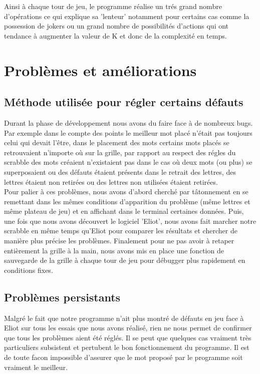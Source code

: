 \documentclass[a4paper,8pt,french,fleqn]{article}
\begin{document}
Ainsi à chaque tour de jeu, le programme réalise un trés grand nombre d'opérations ce qui explique sa 'lenteur' notamment pour certains cas comme la possession de jokers ou un grand nombre de possibilités d'actions qui ont tendance à augmenter la valeur de K et donc de la complexité en temps. 

\newpage

\section{Problèmes et améliorations}

\subsection{Méthode utilisée pour régler certains défauts}

Durant la phase de développement nous avons du faire face à de nombreux bugs. Par exemple dans le compte des points le meilleur mot placé n'était pas toujours celui qui devait l'être, dans le placement des mots certains mots placés se retrouvaient n'importe où sur la grille, par rapport au respect des régles du scrabble des mots créaient n'existaient pas dans le cas où deux mots (ou plus) se superposaient ou des défauts étaient présents dans le retrait des lettres, des lettres étaient non retirées ou des lettres non utilisées étaient retirées. \\

Pour palier à ces problèmes, nous avons d'abord cherché par tâtonnement en se remettant dans les mêmes conditions d'apparition du problème (même lettres et même plateau de jeu) et en affichant dans le terminal certaines données. Puis, une fois que nous avons découvert le logiciel 'Eliot', nous avons fait marcher notre scrabble en même temps qu'Eliot pour comparer les résultats et chercher de manière plus précise les problèmes. Finalement pour ne pas avoir à retaper entièrement la grille à la main, nous avons mis en place une fonction de sauvegarde de la grille à chaque tour de jeu pour débugger plus rapidement en conditions fixes.

\subsection{Problèmes persistants}

Malgré le fait que notre programme n'ait plus montré de défauts en jeu face à Eliot sur tous les essais que nous avons réalisé, rien ne nous permet de confirmer que tous les problèmes aient été réglés. Il se peut que quelques cas vraiment très particuliers subsistent et pertubent le bon fonctionnement du programme. Il est de toute facon impossible d'assurer que le mot proposé par le programme soit vraiment le meilleur.
\end{document}
